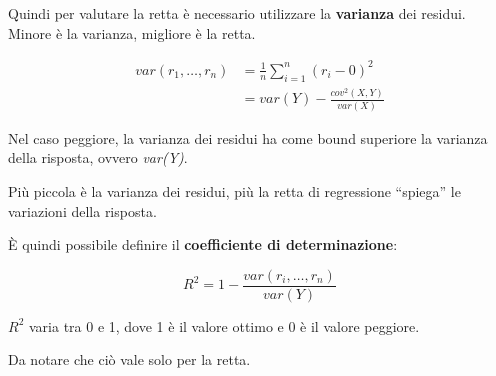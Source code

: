 Quindi per valutare la retta è necessario utilizzare la
\textbf{varianza} dei residui. Minore è la varianza, migliore è la
retta.

\begin{align*}
	var(r_1, \ldots, r_n) &= \frac{1}{n} \sum\limits_{i=1}^{n} (r_{i} - 0)^2 \\
									  &= var(Y) - \frac{cov^2(X,Y)}{var(X)}
\end{align*}

Nel caso peggiore, la varianza dei residui ha come bound superiore la
varianza della risposta, ovvero \emph{var(Y)}.

Più piccola è la varianza dei residui, più la retta di regressione ``spiega'' le variazioni della risposta.

È quindi possibile definire il \textbf{coefficiente di determinazione}:

$$
R^2 = 1 - \frac{var(r_i, \ldots, r_n)}{var(Y)}
$$

$R^2$ varia tra 0 e 1, dove 1 è il valore ottimo e 0 è il valore
peggiore.

Da notare che ciò vale solo per la retta.
